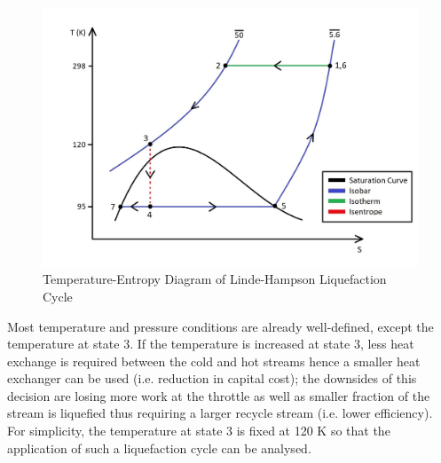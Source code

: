 \documentclass[11pt,oneside]{article}
\begin{document}
        \begin{figure}[H]
            \centering
            \includegraphics[scale=0.3]{liquefier_T-S_diagram.jpg}
            \caption{Temperature-Entropy Diagram of Linde-Hampson Liquefaction Cycle}
            \label{liquefier_T-S_diagram}
        \end{figure}
        \noindent Most temperature and pressure conditions are already well-defined, except the temperature at state 3. If the temperature is increased at state 3, less heat exchange is required between the cold and hot streams hence a smaller heat exchanger can be used (i.e. reduction in capital cost); the downsides of this decision are losing more work at the throttle as well as smaller fraction of the stream is liquefied thus requiring a larger recycle stream (i.e. lower efficiency). For simplicity, the temperature at state 3 is fixed at 120 K so that the application of such a liquefaction cycle can be analysed. \\
        
\end{document}
